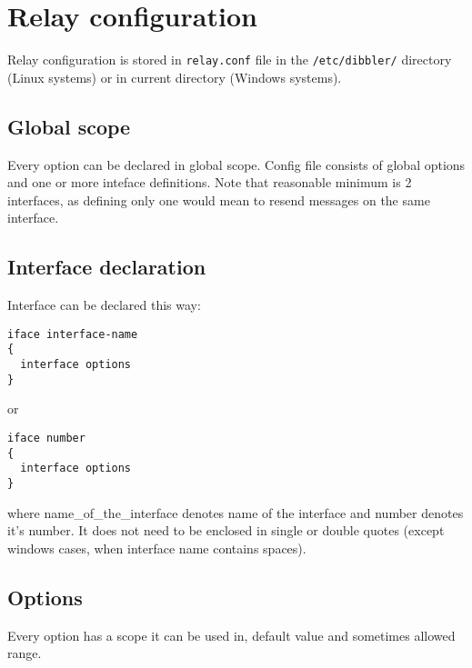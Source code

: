 \newpage
\section{Relay configuration}
\label{relay-conf}
Relay configuration is stored in \verb+relay.conf+ file in the
\verb+/etc/dibbler/+ directory (Linux systems) or in current directory
(Windows systems).

\subsection{Global scope}

Every option can be declared in global scope.
Config file consists of global options and one or more inteface
definitions. Note that reasonable minimum is 2 interfaces, as defining
only one would mean to resend messages on the same interface.

\subsection{Interface declaration}

Interface can be declared this way:
\begin{lstlisting}
iface interface-name
{
  interface options
}
\end{lstlisting}

or

\begin{lstlisting}
iface number
{
  interface options
}
\end{lstlisting}

where name\_of\_the\_interface denotes name of the interface and
number denotes it's number. It does not need to be enclosed in
single or double quotes (except windows cases, when interface name
contains spaces).

\subsection{Options}

Every option has a scope it can be used in, default value and
sometimes allowed range.

